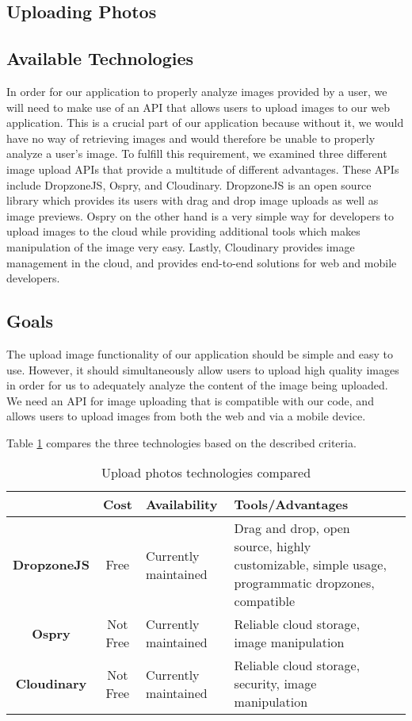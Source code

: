 \documentclass[letterpaper,10pt,draftclsnofoot,onecolumn]{IEEEtran}
\begin{document}
\begin{flushleft}
\section{Uploading Photos}
\subsection{Available Technologies}
In order for our application to properly analyze images provided by a user, we will need to make use of an API that allows users to upload images to our web application. This is a crucial part of our application because without it, we would have no way of retrieving images and would therefore be unable to properly analyze a user’s image. To fulfill this requirement, we examined three different image upload APIs that provide a multitude of different advantages. These APIs include DropzoneJS, Ospry, and Cloudinary. DropzoneJS is an open source library which provides its users with drag and drop image uploads as well as image previews\cite{14}. Ospry on the other hand is a very simple way for developers to upload images to the cloud while providing additional tools which makes manipulation of the image very easy\cite{16}. Lastly, Cloudinary provides image management in the cloud, and provides end-to-end solutions for web and mobile developers\cite{15}.
\subsection{Goals}
The upload image functionality of our application should be simple and easy to use. However, it should simultaneously allow users to upload high quality images in order for us to adequately analyze the content of the image being uploaded. We need an API for image uploading that is compatible with our code, and allows users to upload images from both the web and via a mobile device.
\medskip


Table \ref{table:4} compares the three technologies based on the described criteria. \cite{14} \cite{15} \cite{16} \cite{25}
\begin{table}[h!]
\caption{Upload photos technologies compared}\label{table:4}
\centering
	\begin{tabular}{| c | c |  p{5cm}  |  p{5cm}  | c |} 
		\hline
		 & Cost & Availability & Tools/Advantages \\ [0.5ex] 
		\hline
		\textbf{DropzoneJS} & Free & Currently maintained & Drag and drop, open source, highly customizable, simple usage, programmatic dropzones, compatible \\ 
		\hline
		\textbf{Ospry} & Not Free & Currently maintained & Reliable cloud storage, image manipulation  \\
		\hline
		\textbf{Cloudinary} & Not Free & Currently maintained & Reliable cloud storage, security, image manipulation \\
		\hline
	\end{tabular}
\end{table}


\end{flushleft}
\end{document}
